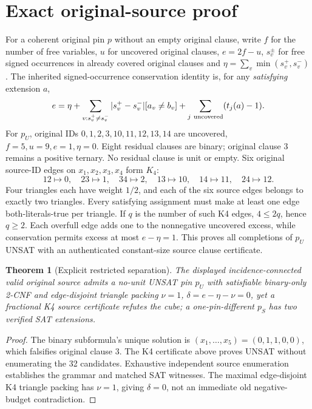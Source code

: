 \documentclass[11pt]{article}
\newtheorem{theorem}{Theorem}
\begin{document}
\section{Exact original-source proof}
For a coherent original pin $p$ without an empty original clause, write $f$ for the number of free variables, $u$ for uncovered original clauses, $e=2f-u$, $s_v^\pm$ for free signed occurrences in already covered original clauses and $\eta=\sum_v\min(s_v^+,s_v^-)$. The inherited signed-occurrence conservation identity is, for any \emph{satisfying} extension $a$,
\[
e=\eta+\sum_{v:s_v^+\ne s_v^-}|s_v^+-s_v^-|[a_v\ne b_v]
+\sum_{j\ {\rm uncovered}}(t_j(a)-1).
\]
For $p_U$, original IDs $0,1,2,3,10,11,12,13,14$ are uncovered, $f=5,u=9,e=1,\eta=0$. Eight residual clauses are binary; original clause 3 remains a positive ternary. No residual clause is unit or empty. Six original source-ID edges on $x_1,x_2,x_3,x_4$ form $K_4$:
\[
12\mapsto0,\quad23\mapsto1,\quad34\mapsto2,\quad13\mapsto10,\quad14\mapsto11,\quad24\mapsto12.
\]
Four triangles each have weight $1/2$, and each of the six source edges belongs to exactly two triangles. Every satisfying assignment must make at least one edge both-literals-true per triangle. If $q$ is the number of such K4 edges, $4\le2q$, hence $q\ge2$. Each overfull edge adds one to the nonnegative uncovered excess, while conservation permits excess at most $e-\eta=1$. This proves all completions of $p_U$ UNSAT with an authenticated constant-size source clause certificate.
\begin{theorem}[Explicit restricted separation]
The displayed incidence-connected valid original source admits a no-unit UNSAT pin $p_U$ with satisfiable binary-only 2-CNF and edge-disjoint triangle packing $\nu=1$, $\delta=e-\eta-\nu=0$, yet a fractional K4 source certificate refutes the cube; a one-pin-different $p_S$ has two verified SAT extensions.
\end{theorem}
\begin{proof}
The binary subformula's unique solution is $(x_1,\ldots,x_5)=(0,1,1,0,0)$, which falsifies original clause 3. The K4 certificate above proves UNSAT without enumerating the 32 candidates. Exhaustive independent source enumeration establishes the grammar and matched SAT witnesses. The maximal edge-disjoint K4 triangle packing has $\nu=1$, giving $\delta=0$, not an immediate old negative-budget contradiction.
\end{proof}
\end{document}
